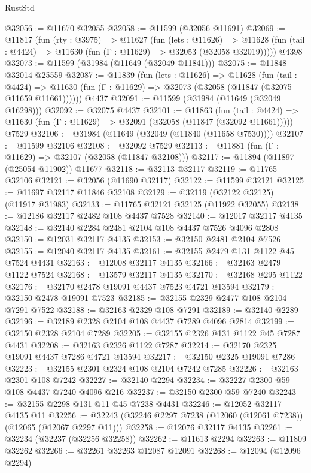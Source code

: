 \begin{lexlean}{RustStd}
\begin{coremodule}
@32056 := @11670 @32055
@32058 := @11599 (@32056 @11691)
@32069 := @11817
    (fun (rty : @3975) =>
    @11627
      (fun (lets : @11626) =>
      @11628 (fun (tail : @4424) => @11630 (fun (Γ : @11629) => @32053 (@32058 @32019)))))
    @4398
@32073 := @11599 (@31984 (@11649 (@32049 @11841)))
@32075 := @11848 @32014 @25559
@32087 := @11839
    (fun (lets : @11626) =>
    @11628
      (fun (tail : @4424) =>
      @11630 (fun (Γ : @11629) => @32073 (@32058 (@11847 (@32075 @11659 @11661))))))
    @4437
@32091 := @11599 (@31984 (@11649 (@32049 @16298)))
@32092 := @32075 @4437
@32101 := @11863
    (fun (tail : @4424) => @11630 (fun (Γ : @11629) => @32091 (@32058 (@11847 (@32092 @11661)))))
    @7529
@32106 := @31984 (@11649 (@32049 (@11840 (@11658 @7530))))
@32107 := @11599 @32106
@32108 := @32092 @7529
@32113 := @11881 (fun (Γ : @11629) => @32107 (@32058 (@11847 @32108)))
@32117 := @11894 (@11897 (@25054 @11902)) @11677
@32118 := @32113 @32117
@32119 := @11765 @32106
@32121 := @32056 (@11690 @32117)
@32122 := @11599 @32121
@32125 := @11697 @32117 @11846 @32108
@32129 := @32119 (@32122 @32125) (@11917 @31983)
@32133 := @11765 @32121 @32125 (@11922 @32055)
@32138 := @12186 @32117 @2482 @108 @4437 @7528
@32140 := @12017 @32117 @4135
@32148 := @32140 @2284 @2481 @2104 @108 @4437 @7526 @4096 @2808
@32150 := @12031 @32117 @4135
@32153 := @32150 @2481 @2104 @7526
@32155 := @12040 @32117 @4135
@32161 := @32155 @2479 @131 @1122 @45 @7524 @4431
@32163 := @12008 @32117 @4135
@32166 := @32163 @2479 @1122 @7524
@32168 := @13579 @32117 @4135
@32170 := @32168 @295 @1122
@32176 := @32170 @2478 @19091 @4437 @7523 @4721 @13594
@32179 := @32150 @2478 @19091 @7523
@32185 := @32155 @2329 @2477 @108 @2104 @7291 @7522
@32188 := @32163 @2329 @108 @7291
@32189 := @32140 @2289
@32196 := @32189 @2328 @2104 @108 @4437 @7289 @4096 @2814
@32199 := @32150 @2328 @2104 @7289
@32205 := @32155 @2326 @131 @1122 @45 @7287 @4431
@32208 := @32163 @2326 @1122 @7287
@32214 := @32170 @2325 @19091 @4437 @7286 @4721 @13594
@32217 := @32150 @2325 @19091 @7286
@32223 := @32155 @2301 @2324 @108 @2104 @7242 @7285
@32226 := @32163 @2301 @108 @7242
@32227 := @32140 @2294
@32234 := @32227 @2300 @59 @108 @4437 @7240 @4096 @216
@32237 := @32150 @2300 @59 @7240
@32243 := @32155 @2298 @131 @11 @45 @7238 @4431
@32246 := @12052 @32117 @4135 @11
@32256 := @32243 (@32246 @2297 @7238 (@12060 (@12061 @7238)) (@12065 (@12067 @2297 @11)))
@32258 := @12076 @32117 @4135
@32261 := @32234 (@32237 (@32256 @32258))
@32262 := @11613 @2294
@32263 := @11809 @32262
@32266 := @32261 @32263 @12087 @12091
@32268 := @12094 (@12096 @2294)

\end{coremodule}
\end{lexlean}
